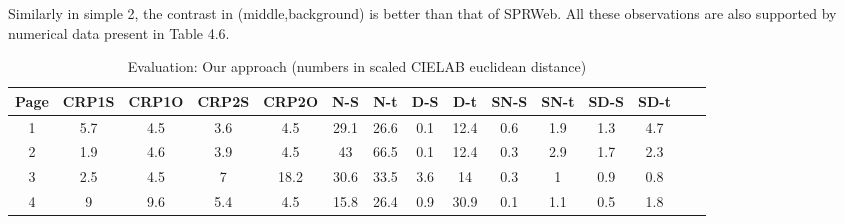 Similarly in simple 2, the contrast in (middle,background) is better than that of SPRWeb. All these observations are also supported by numerical data present in Table 4.6.

\begin{table}[!htb]
\caption{Evaluation: Our approach (numbers in scaled CIELAB euclidean distance)}
\centering
\begin{tabular}{c c c c c c c c c c c c c c c}
\hline\hline
Page & CRP1S & CRP1O & CRP2S & CRP2O & N-S & N-t & D-S & D-t & SN-S & SN-t & SD-S & SD-t\\ [0.5ex]

\hline
1& 5.7 & 4.5 & 3.6 & 4.5 & 29.1 & 26.6 & 0.1 & 12.4 & 0.6 & 1.9 & 1.3 & 4.7\\
2& 1.9 & 4.6 & 3.9 & 4.5 & 43 & 66.5 & 0.1 & 12.4 & 0.3 & 2.9 & 1.7 & 2.3\\
3& 2.5 & 4.5 & 7 & 18.2 & 30.6 & 33.5 & 3.6 & 14 & 0.3 & 1 & 0.9 & 0.8\\
4& 9 & 9.6 & 5.4 & 4.5 & 15.8 & 26.4 & 0.9 & 30.9 & 0.1 & 1.1 & 0.5 & 1.8\\[1ex]

\hline
\end{tabular}
\label{table:nonlin}
\end{table}
